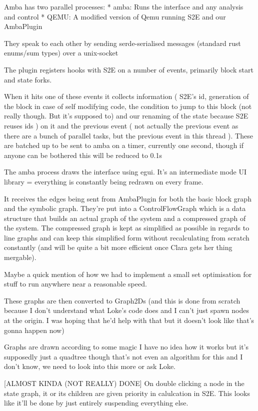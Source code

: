 Amba has two parallel processes:
* amba: Runs the interface and any analysis and control
* QEMU: A modified version of Qemu running S2E and our AmbaPlugin

They speak to each other by sending serde-serialised messages
(standard rust enums/sum types) over a unix-socket

The plugin registers hooks with S2E on a number of events, primarily
block start and state forks.

When it hits one of these events it collects information (
    S2E's id,
    generation of the block in case of self modifying code,
    the condition to jump to this block (not really though. But it's supposed to)
    and our renaming of the state because S2E reuses ids
)
on it and the previous event (
    not actually the previous event as there are a bunch of parallel
    tasks, but the previous event in this thread
). These are batched up to be sent to amba on a timer, currently
one second, though if anyone can be bothered this will be reduced to
0.1s

The amba process draws the interface using egui. It's an intermediate
mode UI library = everything is constantly being redrawn on every
frame.

It receives the edges being sent from AmbaPlugin for both the basic
block graph and the symbolic graph. They're put into a
ControlFlowGraph which is a data structure that builds an actual graph
of the system and a compressed graph of the system. The compressed
graph is kept as simplified as possible in regards to line graphs and
can keep this simplified form without recalculating from scratch
constantly (and will be quite a bit more efficient once Clara gets her
thing mergable).

Maybe a quick mention of how we had to implement a small set
optimisation for stuff to run anywhere near a reasonable speed.

These graphs are then converted to Graph2Ds (and this is done from
scratch because I don't understand what Loke's code does and I can't
just spawn nodes at the origin. I was hoping that he'd help with that
but it doesn't look like that's gonna happen now)

Graphs are drawn according to some magic I have no idea how it works
but it's supposedly just a quadtree though that's not even an
algorithm for this and I don't know, we need to look into this more or
ask Loke.

[ALMOST KINDA (NOT REALLY) DONE]
On double clicking a node in the state graph, it or its children are
given priority in calulcation in S2E. This looks like it'll be done by
just entirely suspending everything else.

